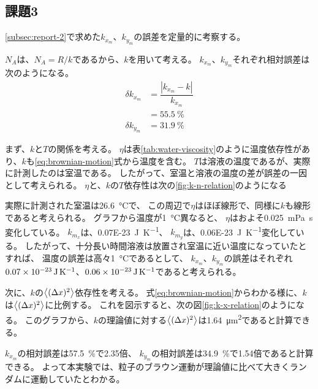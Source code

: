 \subsection{課題3}
\ref{subsec:report-2}で求めた$k_{x_m}$、$k_{y_m}$の誤差を定量的に考察する。

$N_A$は、$N_A=R/k$であるから、$k$を用いて考える。
$k_{x_m}$、$k_{y_m}$それぞれ相対誤差は次のようになる。
\begin{align}
    \delta k_{x_m} & = \dfrac{\left| k_{x_m} - k \right|}{ k_{x_m} } \nonumber \\
                   & = \SI{55.5}{\percent}                                     \\
    \delta k_{y_m} & = \SI{31.9}{\percent}
\end{align}

まず、$k$と$T$の関係を考える。
$\eta$は表\ref{tab:water-viscosity}のように温度依存性があり、$k$も\ref{eq:brownian-motion}式から温度を含む。
$T$は溶液の温度であるが、実際に計測したのは室温である。
したがって、室温と溶液の温度の差が誤差の一因として考えられる。
$\eta$と、$k$の$T$依存性は次の\ref{fig:k-n-relation}のようになる



実際に計測された室温は\SI{26.6}{\celsius}で、
この周辺で$\eta$はほぼ線形で、同様に$k$も線形であると考えられる。
グラフから温度が\SI{1}{\celsius}異なると、
$\eta$はおよそ\SI{0.025}{\milli\pascal\second}変化している。
$k_{m_x}$は、\SI{0.07E-23}{\joule\per\kelvin}、
$k_{m_y}$は、\SI{0.06E-23}{\joule\per\kelvin}変化している。
したがって、十分長い時間溶液は放置され室温に近い温度になっていたとすれば、
温度の誤差は高々\SI{1}{\celsius}であるとして、
$k_{x_m}$、$k_{y_m}$の誤差はそれぞれ
$\SI{0.07E-23}{\joule\per\kelvin}$、$\SI{0.06E-23}{\joule\per\kelvin}$であると考えられる。

次に、$k$の$\left< (\Delta x)^2 \right>$依存性を考える。
式\ref{eq:brownian-motion}からわかる様に、$k$は$\left< (\Delta x)^2 \right>$に比例する。
これを図示すると、次の図\ref{fig:k-x-relation}のようになる。
このグラフから、$k$の理論値に対する$\left< (\Delta x)^2 \right>$は\SI{1.64}{\micro\meter\squared}であると計算できる。

$k_{x_m}$の相対誤差は\SI{57.5}{\percent}で2.35倍、
$k_{y_m}$の相対誤差は\SI{34.9}{\percent}で1.54倍であると計算できる。
よって本実験では、粒子のブラウン運動が理論値に比べて大きくランダムに運動していたとわかる。




